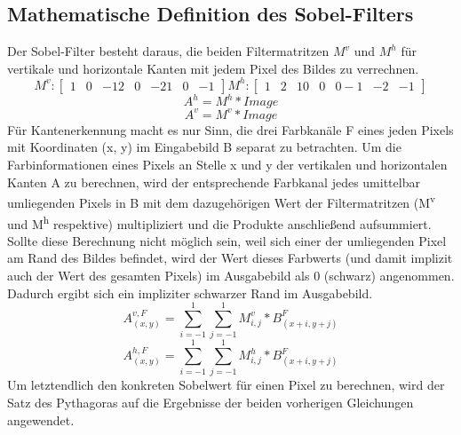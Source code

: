 \documentclass[course=erap]{aspdoc}
\begin{document}
\subsection{Mathematische Definition des Sobel-Filters}
\label{subsec:math-def}
Der Sobel-Filter besteht daraus, die beiden Filtermatritzen $M^{v}$ und $M^{h}$ für vertikale und horizontale Kanten mit jedem Pixel des Bildes zu verrechnen.
\begin{equation}
    M^{v} :
    \begin{bmatrix}
        1 & 0 & -1
        2 & 0 & -2
        1 & 0 & -1
    \end{bmatrix}
    M^{h} :
    \begin{bmatrix}
        1 & 2 & 1
        0 & 0 & 0
        -1 & -2 & -1
    \end{bmatrix}\label{eq:mvmh}
\end{equation}
\begin{equation}
    A^{h} = M^{h} * Image\label{eq:faltenhorizontal}
\end{equation}
\begin{equation}
    A^{v} = M^{v} * Image\label{eq:faltenvertikal}
\end{equation}
Für Kantenerkennung macht es nur Sinn, die drei Farbkanäle F eines jeden Pixels mit Koordinaten (x, y) im Eingabebild B separat zu betrachten.
Um die Farbinformationen eines Pixels an Stelle x und y der vertikalen und horizontalen Kanten A zu berechnen, wird der entsprechende Farbkanal jedes umittelbar umliegenden Pixels in B mit dem dazugehörigen Wert der Filtermatritzen (M\textsuperscript{v} und M\textsuperscript{h} respektive) multipliziert und die Produkte anschließend aufsummiert.
Sollte diese Berechnung nicht möglich sein, weil sich einer der umliegenden Pixel am Rand des Bildes befindet, wird der Wert dieses Farbwerts (und damit implizit auch der Wert des gesamten Pixels) im Ausgabebild als 0 (schwarz) angenommen.
Dadurch ergibt sich ein impliziter schwarzer Rand im Ausgabebild.
\begin{equation}
    A_(x,y)^{v,F} = \sum_{i=-1}^{1} \sum_{j=-1}^{1} M^{v}_{i,j} * B_{(x+i,y+j)}^{F}\label{eq:sumav}
\end{equation}
\begin{equation}
    A_(x,y)^{h,F} = \sum_{i=-1}^{1} \sum_{j=-1}^{1} M^{h}_{i,j} * B_{(x+i,y+j)}^{F}\label{eq:sumah}
\end{equation}
Um letztendlich den konkreten Sobelwert für einen Pixel zu berechnen, wird der Satz des Pythagoras auf die Ergebnisse der beiden vorherigen Gleichungen angewendet.
\end{document}
